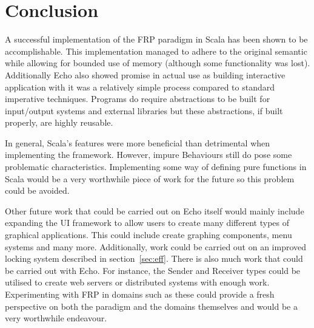 \chapter{Conclusion}

A successful implementation of the FRP paradigm in Scala has been shown to be accomplishable. This implementation
managed to adhere to the original semantic while allowing for bounded use of memory (although some functionality was
lost). Additionally Echo also showed promise in actual use as building interactive application with it
was a relatively simple process compared to standard imperative techniques. Programs do require abstractions
to be built for input/output systems and external libraries but these abstractions, if built properly, are highly
reusable.

In general, Scala's features were more beneficial than detrimental when implementing the framework. However,
impure Behaviours still do pose some problematic characteristics. Implementing some way of defining pure functions
in Scala would be a very worthwhile piece of work for the future so this problem could be avoided.

Other future work that could be carried out on Echo itself would mainly include expanding the
UI framework to allow users to create many different types of graphical applications. This could include
create graphing components, menu systems and many more. Additionally,
work could be carried out on an improved locking system described in section~\ref{sec:eff}. There is also much
work that could be carried out with Echo. For instance, the Sender and Receiver types could be utilised
to create web servers or distributed systems with enough work. Experimenting with FRP in domains such as
these could provide a fresh perspective on both the paradigm and the domains themselves and would be a very
worthwhile endeavour.